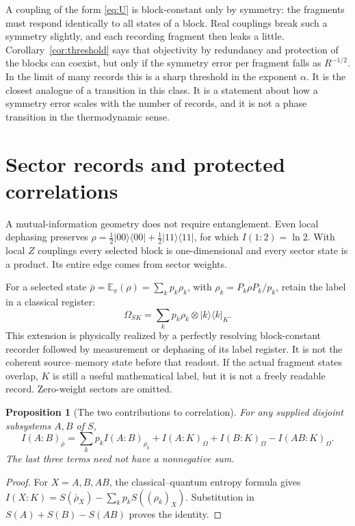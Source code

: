 \documentclass[12pt,a4paper]{article}
\newtheorem{proposition}[theorem]{Proposition}
\newcommand{\E}{\mathbb E}
\newcommand{\proj}[1]{|#1\rangle\!\langle #1|}
\begin{document}
A coupling of the form \eqref{eq:U} is block-constant only by symmetry: the fragments must respond identically to all states of a block. Real couplings break such a symmetry slightly, and each recording fragment then leaks a little. Corollary~\ref{cor:threshold} says that objectivity by redundancy and protection of the blocks can coexist, but only if the symmetry error per fragment falls as $R^{-1/2}$. In the limit of many records this is a sharp threshold in the exponent $\alpha$. It is the closest analogue of a transition in this class. It is a statement about how a symmetry error scales with the number of records, and it is not a phase transition in the thermodynamic sense.

\section{Sector records and protected correlations}
\label{sec:sector}

A mutual-information geometry does not require entanglement. Even local
dephasing preserves
$\rho=\frac12\proj{00}+\frac12\proj{11}$, for which
$I(1:2)=\ln2$. With local $Z$ couplings every selected block is
one-dimensional and every sector state is a product. Its entire edge
comes from sector weights.

For a selected state $\bar\rho=\E_\pi(\rho)=\sum_kp_k\rho_k$, with
$\rho_k=P_k\rho P_k/p_k$, retain the label in a classical register:
\begin{equation}\label{eq:sector-extension}
 \Omega_{SK}=\sum_kp_k\rho_k\otimes\proj{k}_K .
\end{equation}
This extension is physically realized by a perfectly resolving
block-constant recorder followed by measurement or dephasing of its
label register. It is not the coherent source--memory state before
that readout. If the actual fragment states overlap, $K$ is
still a useful mathematical label, but it is not a freely readable
record. Zero-weight sectors are omitted.

\begin{proposition}[The two contributions to correlation]
\label{prop:sector-mi}
For any supplied disjoint subsystems $A,B$ of $S$,
\begin{equation}\label{eq:sector-mi}
 I(A:B)_{\bar\rho}
 =\sum_kp_k I(A:B)_{\rho_k}
  +I(A:K)_\Omega+I(B:K)_\Omega-I(AB:K)_\Omega .
\end{equation}
The last three terms need not have a nonnegative sum.
\end{proposition}
\begin{proof}
For $X=A,B,AB$, the classical--quantum entropy formula gives
$I(X:K)=S(\bar\rho_X)-\sum_kp_kS((\rho_k)_X)$.
Substitution in $S(A)+S(B)-S(AB)$ proves the identity.
\end{proof}
\end{document}
